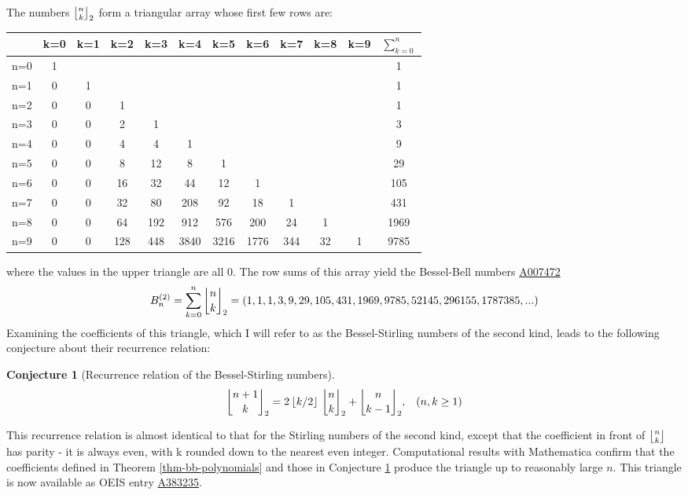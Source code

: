 \documentclass[a4paper]{amsart}
\newcommand{\mStirling}[0]{\genfrac{\lfloor}{\rfloor}{0pt}{}}
\newcommand{\floor}[1]{\left\lfloor #1 \right\rfloor}
\newtheorem{conjecture}[theorem]{Conjecture}
\begin{document}
The numbers $\mStirling{n}{k}_2$ form a triangular array whose first few rows are:
\begin{center}
\begin{tabular}{|l|*{10}{c}|c|}
\hline
      & k=0 & k=1 & k=2 & k=3 & k=4 & k=5 & k=6 & k=7 & k=8 & k=9 & $\sum_{k=0}^{n}$ \\
\hline
n=0 & 1   &     &     &     &     &     &     &     &     &     & 1                \\
n=1 & 0   & 1   &     &     &     &     &     &     &     &     & 1                \\
n=2 & 0   & 0   & 1   &     &     &     &     &     &     &     & 1                \\
n=3 & 0   & 0   & 2   & 1   &     &     &     &     &     &     & 3                \\
n=4 & 0   & 0   & 4   & 4   & 1   &     &     &     &     &     & 9                \\
n=5 & 0   & 0   & 8   & 12  & 8   & 1   &     &     &     &     & 29               \\
n=6 & 0   & 0   & 16  & 32  & 44  & 12  & 1   &     &     &     & 105              \\
n=7 & 0   & 0   & 32  & 80  & 208 & 92  & 18  & 1   &     &     & 431              \\
n=8 & 0   & 0   & 64  & 192 & 912 & 576 & 200 & 24  & 1   &     & 1969             \\
n=9 & 0   & 0   & 128 & 448 & 3840& 3216& 1776& 344 & 32  & 1   & 9785             \\
\hline
\end{tabular}
\smallskip
\end{center}
where the values in the upper triangle are all 0. The row sums of this array yield the Bessel-Bell numbers \href{https://oeis.org/A007472}{A007472}
\[
B_n^{(2)} = \sum_{k=0}^{n}\genfrac{\lfloor}{\rfloor}{0pt}{}{n}{k}_2 = (1, 1, 1, 3, 9, 29, 105, 431, 1969, 9785, 52145, 296155, 1787385, ...)
\]
Examining the coefficients of this triangle, which I will refer to as the Bessel-Stirling numbers of the second kind, leads to the following conjecture about their recurrence relation:
\begin{conjecture}[Recurrence relation of the Bessel-Stirling numbers]\label{conj-bs-recurrence}
\[
\mStirling{n+1}{k}_2 = 2\floor{k/2} \, \mStirling{n}{k}_2 + \mStirling{n}{k-1}_2, \,\,\,\,\, (n, k \ge 1)\\
\]    
\end{conjecture}
This recurrence relation is almost identical to that for the Stirling numbers of the second kind, except that the coefficient in front of $\mStirling{n}{k}$ has parity - it is always even, with k rounded down to the nearest even integer. Computational results with Mathematica confirm that the coefficients defined in Theorem \ref{thm-bb-polynomials} and those in Conjecture \ref{conj-bs-recurrence} produce the triangle up to reasonably large $n$. This triangle is now available as OEIS entry \href{https://oeis.org/A383235}{A383235}.
\end{document}
